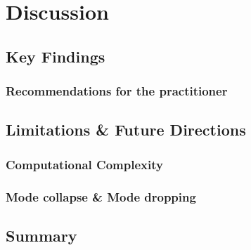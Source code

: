 \chapter{Discussion}

\section{Key Findings}

\subsection{Recommendations for the practitioner}

\section{Limitations \& Future Directions}

\subsection{Computational Complexity}

\subsection{Mode collapse \& Mode dropping}

\section{Summary}
